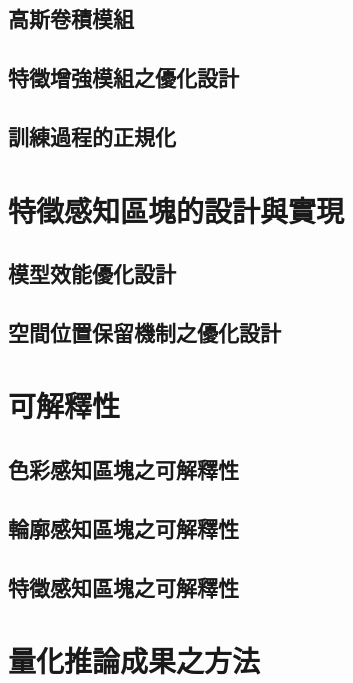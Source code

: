 \documentclass[class=NCU_thesis, crop=false]{standalone}
\begin{document}
	\subsection{高斯卷積模組}

	\subsection{特徵增強模組之優化設計}

	\subsection{訓練過程的正規化}

\section{特徵感知區塊的設計與實現}

	\subsection{模型效能優化設計}

	\subsection{空間位置保留機制之優化設計}

\section{可解釋性}
	\subsection{色彩感知區塊之可解釋性}
	\subsection{輪廓感知區塊之可解釋性}
	\subsection{特徵感知區塊之可解釋性}

\section{量化推論成果之方法}
\end{document}
